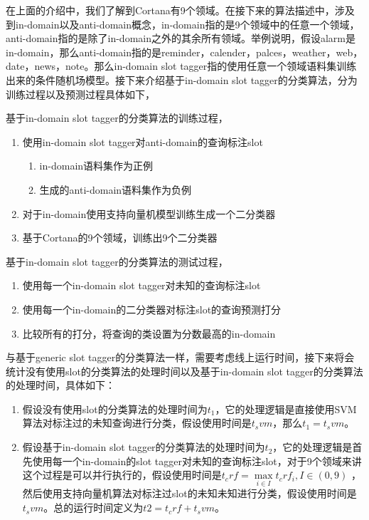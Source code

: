 \documentclass[master]{njuthesis}
\begin{document}
\begin{enumerate}
\begin{enumerate}
\begin{enumerate}
    在上面的介绍中，我们了解到Cortana有9个领域。在接下来的算法描述中，涉及到in-domain以及anti-domain概念，in-domain指的是9个领域中的任意一个领域，anti-domain指的是除了in-domain之外的其余所有领域。举例说明，假设alarm是in-domain，那么anti-domain指的是reminder，calender，palces，weather，web，date，news，note。那么in-domain slot tagger指的使用任意一个领域语料集训练出来的条件随机场模型。接下来介绍基于in-domain slot tagger的分类算法，分为训练过程以及预测过程具体如下，

   基于in-domain slot tagger的分类算法的训练过程，
   \begin{enumerate}
     \item 使用in-domain slot tagger对anti-domain的查询标注slot
       \begin{enumerate}
         \item in-domain语料集作为正例
         \item 生成的anti-domain语料集作为负例
       \end{enumerate}
     \item 对于in-domain使用支持向量机模型训练生成一个二分类器
     \item 基于Cortana的9个领域，训练出9个二分类器
   \end{enumerate}
  
   基于in-domain slot tagger的分类算法的测试过程，
   \begin{enumerate}
     \item 使用每一个in-domain slot tagger对未知的查询标注slot
     \item 使用每一个in-domain的二分类器对标注slot的查询预测打分
     \item 比较所有的打分，将查询的类设置为分数最高的in-domain
   \end{enumerate}
    
    与基于generic slot tagger的分类算法一样，需要考虑线上运行时间，接下来将会统计没有使用slot的分类算法的处理时间以及基于in-domain slot tagger的分类算法的处理时间，具体如下：
\begin{enumerate}
 \item 假设没有使用slot的分类算法的处理时间为$t_1$，它的处理逻辑是直接使用SVM算法对标注过的未知查询进行分类，假设使用时间是$t_svm$，那么$t_1 = t_svm$。
 \item 假设基于in-domain slot tagger的分类算法的处理时间为$t_2$，它的处理逻辑是首先使用每一个in-domain的slot tagger对未知的查询标注slot，对于9个领域来讲这个过程是可以并行执行的，假设使用时间是$t_crf=\max\limits_{i \in I} t_crf_i,I \in (0,9)$ ，然后使用支持向量机算法对标注过slot的未知未知进行分类，假设使用时间是$t_svm$。总的运行时间定义为$t2 = t_crf + t_svm$。
\end{enumerate}


\end{enumerate}
\end{enumerate}
\end{enumerate}
\end{document}
